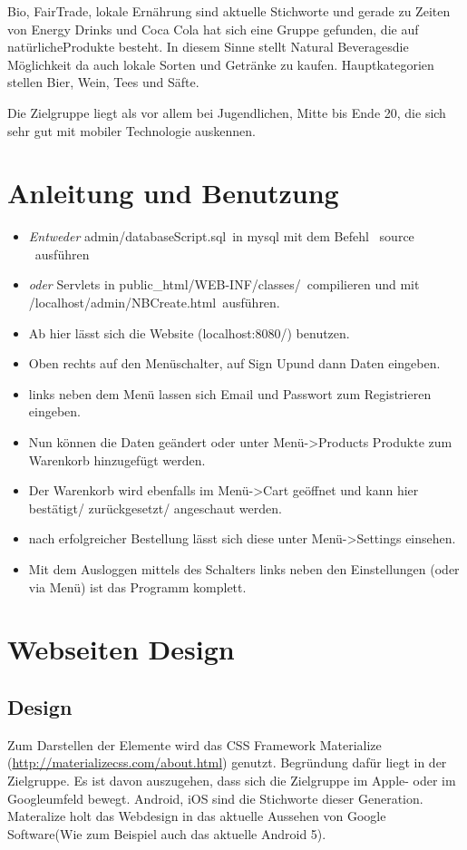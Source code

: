 \documentclass[a4paper, 11pt]{article}
\begin{document}
Bio, FairTrade, lokale Ernährung sind aktuelle Stichworte und gerade zu Zeiten von Energy Drinks und Coca Cola hat sich eine Gruppe gefunden, die auf \grqq natürliche\grqq  Produkte besteht. In diesem Sinne stellt \grqq Natural Beverages\grqq  die Möglichkeit da auch lokale Sorten und Getränke zu kaufen. Hauptkategorien stellen Bier, Wein, Tees und Säfte.

Die Zielgruppe liegt als vor allem bei Jugendlichen, Mitte bis Ende 20, die sich sehr gut mit mobiler Technologie auskennen.
\section{Anleitung und Benutzung}
\begin{itemize}
\item \emph{Entweder} \grqq admin/databaseScript.sql\grqq \ in mysql mit dem Befehl \ \grqq source \grqq \ ausführen
\item \emph{oder} Servlets in \grqq public\_html/WEB-INF/classes/\grqq \ compilieren und mit \\ \grqq /localhost/admin/NBCreate.html\grqq \ ausführen.
\item Ab hier lässt sich die Website (localhost:8080/) benutzen.
\item Oben rechts auf den Menüschalter, auf \grqq Sign Up\grqq  und dann Daten eingeben.
\item links neben dem Menü lassen sich Email und Passwort zum Registrieren eingeben.
\item Nun können die Daten geändert oder unter Menü->Products Produkte zum Warenkorb hinzugefügt werden.
\item Der Warenkorb wird ebenfalls im Menü->Cart geöffnet und kann hier bestätigt/ zurückgesetzt/ angeschaut werden.
\item nach erfolgreicher Bestellung lässt sich diese unter Menü->Settings einsehen.
\item Mit dem Ausloggen mittels des Schalters links neben den Einstellungen (oder via Menü) ist das Programm komplett.
\end{itemize}
\section{Webseiten Design}

\subsection{Design}
Zum Darstellen der Elemente wird das CSS Framework Materialize (\url{http://materializecss.com/about.html}) genutzt. Begründung dafür liegt in der Zielgruppe. Es ist davon auszugehen, dass sich die Zielgruppe im Apple- oder im Googleumfeld bewegt. Android, iOS sind die Stichworte dieser Generation. Materalize holt das Webdesign in das aktuelle Aussehen von Google Software(Wie zum Beispiel auch das aktuelle Android 5). \\
\end{document}
